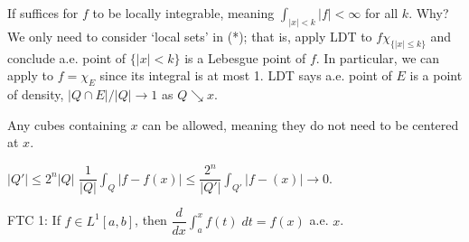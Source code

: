 If suffices for $f$ to be locally integrable, meaning $\int_{|x|<k} |f|<\infty$ for all $k$. Why? We only need to consider `local sets' in (*); that is, apply LDT to $f \chi_{\{|x|\leq k\}}$ and conclude a.e. point of $\{|x|<k\}$ is a Lebesgue point of $f$. In particular, we can apply to $f= \chi_E$ since its integral is at most 1. LDT says a.e. point of $E$ is a point of density, $|Q \cap E|/|Q| \to 1$ as $Q \searrow x$. 


Any cubes containing $x$ can be allowed, meaning they do not need to be centered at $x$.


$|Q'| \leq 2^n |Q|$
$\dfrac{1}{|Q|} \int_Q |f-f(x)| \leq \dfrac{2^n}{|Q'|} \int_{Q'} |f-(x)| \to 0$. 




FTC 1: If $f \in L^1[a,b]$, then $\dfrac{d}{dx} \int_a^x f(t) \;dt= f(x)$ a.e. $x$.  



















